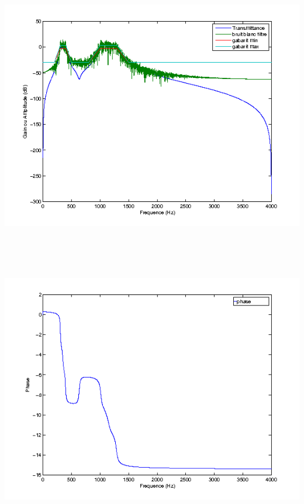 \documentclass{article}
\begin{document}
\inputminted[linenos,lastline=25]{matlab}{RII_Cheby1m.m}
\includegraphics[height=13cm]{cheb1_1}
\inputminted[linenos,firstnumber=29,firstline=29,lastline=29]{matlab}{RII_Cheby1m.m}
\includegraphics[height=10cm]{cheb1_2}
\inputminted[linenos,firstnumber=34,firstline=34,lastline=42]{matlab}{RII_Cheby1m.m}
\end{document}
